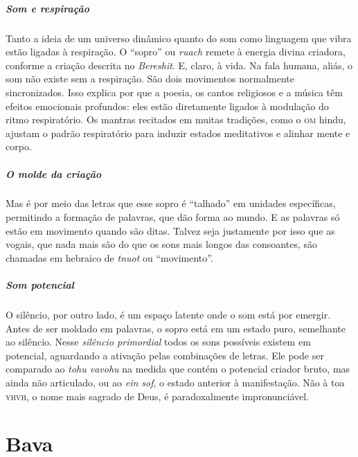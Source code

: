 \paragraph{Som e respiração} Tanto a ideia de um universo dinâmico quanto do som como linguagem que vibra estão ligadas à respiração. O ``sopro'' ou \textit{ruach} remete à energia divina criadora, conforme a criação descrita no \textit{Bereshit}. E, claro, à vida. Na fala humana, aliás, o som não existe sem a respiração. São dois movimentos normalmente sincronizados. Isso explica por que a poesia, os cantos religiosos e a música têm efeitos emocionais profundos: eles estão diretamente ligados à modulação do ritmo respiratório. Os mantras recitados em muitas tradições, como o \textsc{om} hindu, ajustam o padrão respiratório para induzir estados meditativos e alinhar mente e corpo.

\paragraph{O molde da criação} Mas é por meio das letras que esse sopro é ``talhado'' em unidades específicas, permitindo a formação de palavras, que dão forma ao mundo. E as palavras só estão em movimento quando são ditas. Talvez seja justamente por isso que as vogais, que nada mais são do que os sons mais longos das consoantes, são chamadas em hebraico de \textit{tnuot} ou ``movimento''.

\paragraph{Som potencial} O silêncio, por outro lado, é um espaço latente onde o som está por emergir. Antes de ser moldado em palavras, o sopro está em um estado puro, semelhante ao silêncio. Nesse \textit{silêncio primordial} todos os sons possíveis existem em potencial, aguardando a ativação pelas combinações de letras. Ele pode ser comparado ao \textit{tohu vavohu} na medida que contém o potencial criador bruto, mas ainda não articulado, ou ao \textit{ein sof}, o estado anterior à manifestação. Não à toa \textsc{yhvh}, o nome mais sagrado de Deus, é paradoxalmente impronunciável.

\chapter*{Bava \smallskip{}}

